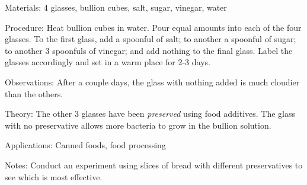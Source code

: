 \begin{multicols}{2}
\begin{description*}
\item[Materials:]{4 glasses, bullion cubes, salt, sugar, vinegar, water}
\item[Procedure:]{Heat bullion cubes in water. Pour equal amounts into each of the four glasses. To the first glass, add a spoonful of salt; to another a spoonful of sugar; to another 3 spoonfuls of vinegar; and add nothing to the final glass. Label the glasses accordingly and set in a warm place for 2-3 days.}
\item[Observations:]{After a couple days, the glass with nothing added is much cloudier than the others.}
\item[Theory:]{The other 3 glasses have been \emph{preserved} using food additives. The glass with no preservative allows more bacteria to grow in the bullion solution.}
\item[Applications:]{Canned foods, food processing}
\item[Notes:]{Conduct an experiment using slices of bread with different preservatives to see which is most effective.}
\end{description*}



\end{multicols}

\pagebreak
